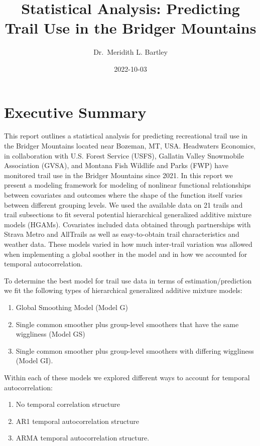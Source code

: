 \documentclass[
]{book}
\title{Statistical Analysis: Predicting Trail Use in the Bridger Mountains}
\author{Dr.~Meridith L. Bartley}
\date{2022-10-03}
\providecommand{\tightlist}{%
  \setlength{\itemsep}{0pt}\setlength{\parskip}{0pt}}
\begin{document}
\maketitle

{
\setcounter{tocdepth}{1}
\tableofcontents
}
\hypertarget{executive-summary}{%
\chapter{Executive Summary}\label{executive-summary}}

This report outlines a statistical analysis for predicting recreational trail use in the Bridger Mountains located near Bozeman, MT, USA. Headwaters Economics, in collaboration with U.S. Forest Service (USFS), Gallatin Valley Snowmobile Association (GVSA), and Montana Fish Wildlife and Parks (FWP) have monitored trail use in the Bridger Mountains since 2021. In this report we present a modeling framework for modeling of nonlinear functional relationships between covariates and outcomes where the shape of the function itself varies between different grouping levels. We used the available data on 21 trails and trail subsections to fit several potential hierarchical generalized additive mixture models (HGAMs). Covariates included data obtained through partnerships with Strava Metro and AllTrails as well as easy-to-obtain trail characteristics and weather data. These models varied in how much inter-trail variation was allowed when implementing a global soother in the model and in how we accounted for temporal autocorrelation.

To determine the best model for trail use data in terms of estimation/prediction we fit the following types of hierarchical generalized additive mixture models:

\begin{enumerate}
\def\labelenumi{\arabic{enumi}.}
\tightlist
\item
  Global Smoothing Model (Model G)
\item
  Single common smoother plus group-level smoothers that have the same wiggliness (Model GS)
\item
  Single common smoother plus group-level smoothers with differing wiggliness (Model GI).
\end{enumerate}

Within each of these models we explored different ways to account for temporal autocorrelation:

\begin{enumerate}
\def\labelenumi{\arabic{enumi}.}
\tightlist
\item
  No temporal correlation structure
\item
  AR1 temporal autocorrelation structure
\item
  ARMA temporal autocorrelation structure.
\end{enumerate}
\end{document}
